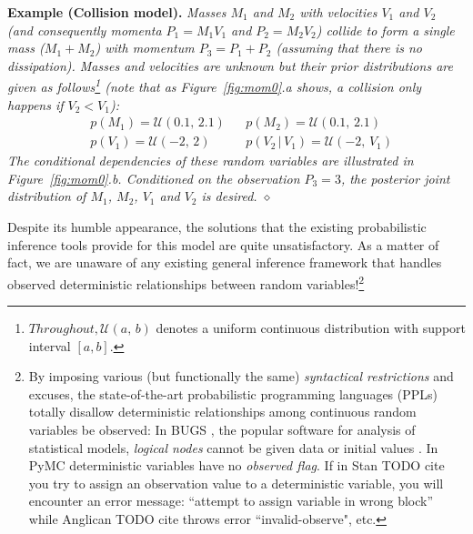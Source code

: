 \documentclass{article}
\newcommand{\pr}{p}
\begin{document}
{\bf Example (Collision model). }
\emph{Masses $M_1$ and $M_2$ with velocities $V_1$ and $V_2$ (and consequently momenta $P_1 = M_1 V_1$ and $P_2 = M_2 V_2$) collide to form a single mass ($M_1 + M_2$) with momentum $P_3 = P_1 + P_2$ (assuming that there is no dissipation).
Masses and velocities are unknown but 
their prior distributions are given as follows\footnote{
$Throughout, \mathcal{U}(a, \, b)$ denotes a uniform continuous distribution 
with {\color{green} support interval} $[a, b]$.
} 
(note that as Figure~\ref{fig:mom0}.a shows, a collision only happens if $V_2 < V_1$):  
}%
\begin{align}
&\pr(M_1) = \mathcal{U}(0.1, \, 2.1) 
&&\pr(M_2) = \mathcal{U}(0.1, \, 2.1)
\nonumber
\\
&\pr(V_1) = \mathcal{U}(-2, \, 2)
&&\pr(V_2 \, | \, V_1) = \mathcal{U}(-2, \, V_1)
\label{e:collision}
\end{align} 
\emph{
The conditional dependencies of these random variables are illustrated in 
Figure~\ref{fig:mom0}.b.
Conditioned on the observation $P_3 = 3$, the posterior joint distribution of $M_1$, $M_2$, $V_1$ and $V_2$ is desired. 
\hspace*{\fill} $\diamond$} %

Despite its humble appearance, the solutions that the existing probabilistic inference tools provide for this model are quite unsatisfactory. 
As a matter of fact, we are unaware of any existing general inference framework that 
handles observed deterministic relationships between random variables!\footnote{
By imposing various (but functionally the same)
\emph{syntactical restrictions} and excuses, 
the state-of-the-art probabilistic programming languages (PPLs) %
totally disallow deterministic relationships among continuous random variables be observed:
In BUGS \cite{lunn2009bugs}, the popular software for analysis of statistical models, \emph{logical nodes} cannot be given data or initial values .
In PyMC \cite{patil2010pymc} deterministic variables have no \emph{observed flag}. 
If in Stan {\color{red}TODO cite} 
you try to assign an observation value to a deterministic variable, you will encounter an error message: 
``attempt to assign variable in wrong block'' while 
Anglican{\color{red} TODO cite} throws error ``invalid-observe", etc.}
\end{document}
